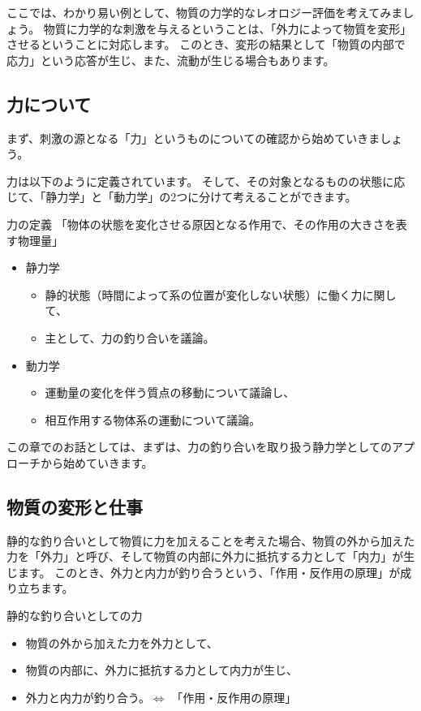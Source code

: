 \documentclass[uplatex,dvipdfmx,a4paper,11pt]{jsarticle}
\begin{document}
ここでは、わかり易い例として、物質の力学的なレオロジー評価を考えてみましょう。
物質に力学的な刺激を与えるということは、「外力によって物質を変形」させるということに対応します。
このとき、変形の結果として「物質の内部で応力」という応答が生じ、また、流動が生じる場合もあります。

\subsection{力について}
まず、刺激の源となる「力」というものについての確認から始めていきましょう。

力は以下のように定義されています。
そして、その対象となるものの状態に応じて、「静力学」と「動力学」の2つに分けて考えることができます。
\large
	\begin{itembox}[l]{力の定義}
		「物体の状態を変化させる原因となる作用で、その作用の大きさを表す物理量」
		\begin{itemize}
			\item 静力学
			\begin{itemize}
				\item 静的状態（時間によって系の位置が変化しない状態）に働く力に関して、
				\item 主として、力の釣り合いを議論。
			\end{itemize}
			\item 動力学
			\begin{itemize}
				\item 運動量の変化を伴う質点の移動について議論し、
				\item 相互作用する物体系の運動について議論。
			\end{itemize}
		\end{itemize}
	\end{itembox}
\normalsize

この章でのお話としては、まずは、力の釣り合いを取り扱う静力学としてのアプローチから始めていきます。

\subsection{物質の変形と仕事}

静的な釣り合いとして物質に力を加えることを考えた場合、物質の外から加えた力を「外力」と呼び、そして物質の内部に外力に抵抗する力として「内力」が生じます。
このとき、外力と内力が釣り合うという、「作用・反作用の原理」が成り立ちます。
\large
	\begin{itembox}[l]{静的な釣り合いとしての力}
		\begin{itemize}
			\item 物質の外から加えた力を外力として、
			\item 物質の内部に、外力に抵抗する力として内力が生じ、
			\item 外力と内力が釣り合う。$\Leftrightarrow$ 「作用・反作用の原理」
		\end{itemize}
	\end{itembox}
\normalsize
\end{document}
